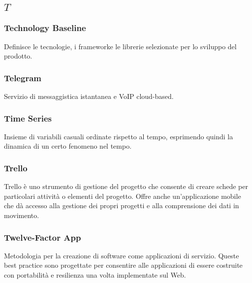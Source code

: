 \subsection*{\quad$T\quad$}
\subsubsection*{Technology Baseline}
Definisce le tecnologie, i framework\glosp e le librerie selezionate per lo sviluppo del prodotto.

\subsubsection*{Telegram}
Servizio di messaggistica istantanea  e VoIP cloud-based.


\subsubsection*{Time Series}
Insieme di variabili casuali ordinate rispetto al tempo, esprimendo quindi la dinamica di un certo fenomeno nel tempo.

\subsubsection*{Trello}
Trello è uno strumento di gestione del progetto che consente di creare schede per particolari attività o elementi del progetto. Offre anche un'applicazione mobile che dà accesso alla gestione dei propri progetti e alla comprensione dei dati in movimento. 

\subsubsection*{Twelve-Factor App}
Metodologia per la creazione di software come applicazioni di servizio. Queste best practice sono progettate per consentire alle applicazioni di essere costruite con portabilità e resilienza una volta implementate sul Web.


